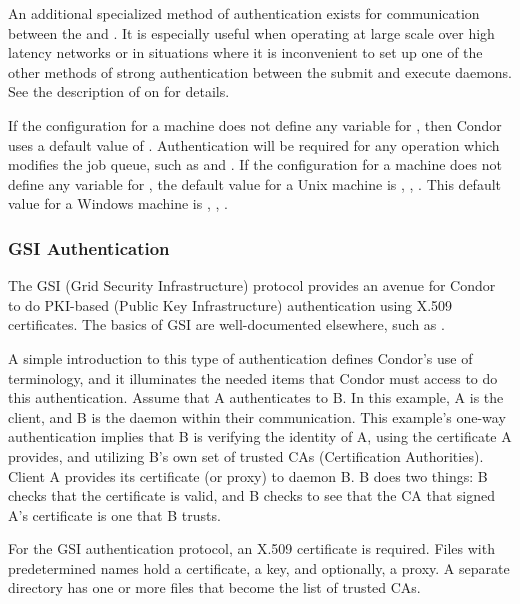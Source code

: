 An additional specialized method of authentication exists for
communication between the  and .  It is
especially useful when operating at large scale over high latency
networks or in situations where it is inconvenient to set up one of
the other methods of strong authentication between the submit and
execute daemons.  See the description of
 on
\pageref{param:SecEnableMatchPasswordAuthentication} for
details.

If the configuration for a machine does not define any variable
for ,
then Condor uses a default value of \verb@OPTIONAL@.
Authentication will be required for
any operation which modifies the job queue,
such as  and .
If the configuration for a machine does not define any variable
for ,
the default value for a Unix machine is \verb@FS@, \verb@KERBEROS@,
\verb@GSI@. 
This default value for a Windows machine is
\verb@NTSSPI@, \verb@KERBEROS@, \verb@GSI@. 

\subsubsection{\label{sec:GSI-Authentication}GSI Authentication}
The GSI (Grid Security Infrastructure) protocol provides
an avenue for Condor to do
PKI-based (Public Key Infrastructure) authentication using X.509
certificates. 
The basics of GSI are well-documented elsewhere, such as
. 

A simple introduction to this type of authentication
defines Condor's use of terminology,
and it illuminates the needed items that Condor must access to
do this authentication.
Assume that 
A authenticates to B.
In this example, A is the client, and B is the daemon within
their communication.
This example's one-way authentication implies that B
is verifying the identity of A,
using the certificate A provides,
and utilizing B's own set of trusted CAs (Certification Authorities).
Client A provides its certificate (or proxy) to daemon B.
B does two things:
B checks that the certificate is valid,
and B checks to see that the CA that signed A's certificate
is one that B trusts.

For the GSI authentication protocol,
an X.509 certificate is required.
Files with predetermined names hold a certificate,
a key, and optionally, a proxy.
A separate directory has one or more files that become the list of
trusted CAs.

